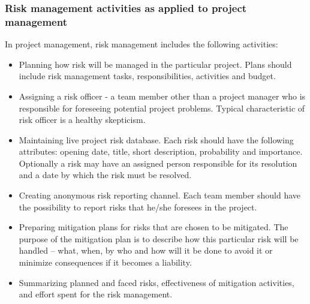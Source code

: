 \documentclass[a4paper,14pt,onecolumn]{article}
\begin{document}
\subsubsection{Risk management activities as applied to project management}
In project management, risk management includes the following activities:
            \begin{itemize}
            \item Planning how risk will be managed in the particular project. Plans should include risk management tasks, responsibilities, activities and budget.
            \item Assigning a risk officer - a team member other than a project manager who is responsible for foreseeing potential project problems. Typical characteristic of risk officer is a healthy skepticism.
            \item Maintaining live project risk database. Each risk should have the following attributes: opening date, title, short description, probability and importance. Optionally a risk may have an assigned person responsible for its resolution and a date by which the risk must be resolved.
            \item Creating anonymous risk reporting channel. Each team member should have the possibility to report risks that he/she foresees in the project.
            \item Preparing mitigation plans for risks that are chosen to be mitigated. The purpose of the mitigation plan is to describe how this particular risk will be handled – what, when, by who and how will it be done to avoid it or minimize consequences if it becomes a liability.
            \item Summarizing planned and faced risks, effectiveness of mitigation activities, and effort spent for the risk management.
            \end{itemize}
\end{document}
